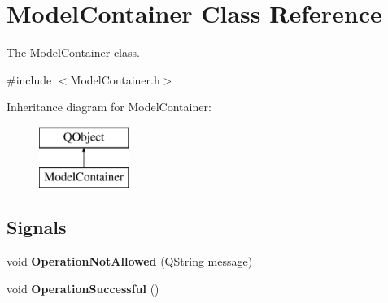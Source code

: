 \hypertarget{class_model_container}{}\section{Model\+Container Class Reference}
\label{class_model_container}


The \hyperlink{class_model_container}{Model\+Container} class.  




{\ttfamily \#include $<$Model\+Container.\+h$>$}

Inheritance diagram for Model\+Container\+:\begin{figure}[H]
\begin{center}
\leavevmode
\includegraphics[height=2.000000cm]{class_model_container}
\end{center}
\end{figure}
\subsection*{Signals}
\begin{DoxyCompactItemize}
\item 
\hypertarget{class_model_container_a313ffe5493b9ed80d7a525f8530ff5f5}{}void {\bfseries Operation\+Not\+Allowed} (Q\+String message)\label{class_model_container_a313ffe5493b9ed80d7a525f8530ff5f5}

\item 
\hypertarget{class_model_container_af965a24540959f575f98f154269fafd6}{}void {\bfseries Operation\+Successful} ()\label{class_model_container_af965a24540959f575f98f154269fafd6}

\end{DoxyCompactItemize}
